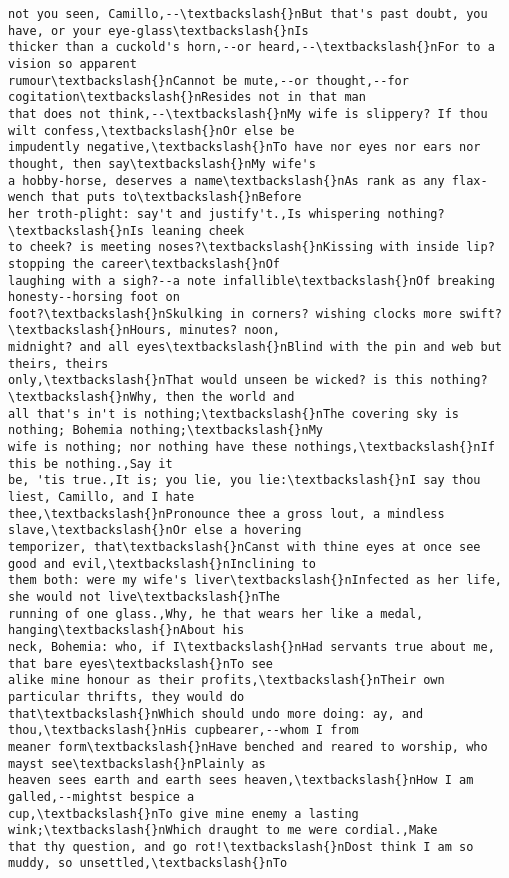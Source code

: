 \documentclass[11pt]{article}
\begin{document}
\begin{tcolorbox}[breakable, size=fbox, boxrule=.5pt, pad at break*=1mm, opacityfill=0]
\begin{Verbatim}[commandchars=\\\{\}]
not you seen, Camillo,--\textbackslash{}nBut that's past doubt, you have, or your eye-glass\textbackslash{}nIs
thicker than a cuckold's horn,--or heard,--\textbackslash{}nFor to a vision so apparent
rumour\textbackslash{}nCannot be mute,--or thought,--for cogitation\textbackslash{}nResides not in that man
that does not think,--\textbackslash{}nMy wife is slippery? If thou wilt confess,\textbackslash{}nOr else be
impudently negative,\textbackslash{}nTo have nor eyes nor ears nor thought, then say\textbackslash{}nMy wife's
a hobby-horse, deserves a name\textbackslash{}nAs rank as any flax-wench that puts to\textbackslash{}nBefore
her troth-plight: say't and justify't.,Is whispering nothing?\textbackslash{}nIs leaning cheek
to cheek? is meeting noses?\textbackslash{}nKissing with inside lip? stopping the career\textbackslash{}nOf
laughing with a sigh?--a note infallible\textbackslash{}nOf breaking honesty--horsing foot on
foot?\textbackslash{}nSkulking in corners? wishing clocks more swift?\textbackslash{}nHours, minutes? noon,
midnight? and all eyes\textbackslash{}nBlind with the pin and web but theirs, theirs
only,\textbackslash{}nThat would unseen be wicked? is this nothing?\textbackslash{}nWhy, then the world and
all that's in't is nothing;\textbackslash{}nThe covering sky is nothing; Bohemia nothing;\textbackslash{}nMy
wife is nothing; nor nothing have these nothings,\textbackslash{}nIf this be nothing.,Say it
be, 'tis true.,It is; you lie, you lie:\textbackslash{}nI say thou liest, Camillo, and I hate
thee,\textbackslash{}nPronounce thee a gross lout, a mindless slave,\textbackslash{}nOr else a hovering
temporizer, that\textbackslash{}nCanst with thine eyes at once see good and evil,\textbackslash{}nInclining to
them both: were my wife's liver\textbackslash{}nInfected as her life, she would not live\textbackslash{}nThe
running of one glass.,Why, he that wears her like a medal, hanging\textbackslash{}nAbout his
neck, Bohemia: who, if I\textbackslash{}nHad servants true about me, that bare eyes\textbackslash{}nTo see
alike mine honour as their profits,\textbackslash{}nTheir own particular thrifts, they would do
that\textbackslash{}nWhich should undo more doing: ay, and thou,\textbackslash{}nHis cupbearer,--whom I from
meaner form\textbackslash{}nHave benched and reared to worship, who mayst see\textbackslash{}nPlainly as
heaven sees earth and earth sees heaven,\textbackslash{}nHow I am galled,--mightst bespice a
cup,\textbackslash{}nTo give mine enemy a lasting wink;\textbackslash{}nWhich draught to me were cordial.,Make
that thy question, and go rot!\textbackslash{}nDost think I am so muddy, so unsettled,\textbackslash{}nTo

\end{Verbatim}
\end{tcolorbox}
\end{document}
